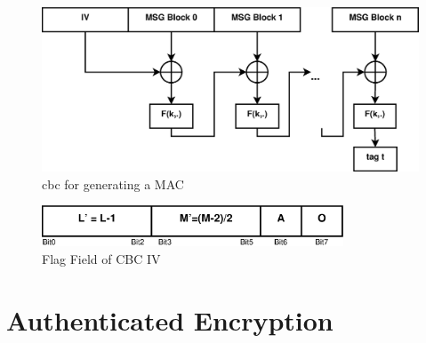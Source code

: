\begin{figure}\label{cbcMAC}
    \centering
    \includegraphics[width=1\textwidth]{figures/CBCMac.eps}
    \caption{\gls{cbc} for generating a MAC}
    \label{fig:cbc_MAC}
\end{figure}

\begin{figure}\label{cbcMACFlags}
    \centering
    \includegraphics[width=0.8\textwidth]{figures/CBCIVFlags.eps}
    \caption{Flag Field of CBC IV}
    \label{fig:cbc_Flags}
\end{figure}

\section{Authenticated Encryption}\label{authEncrypt}

